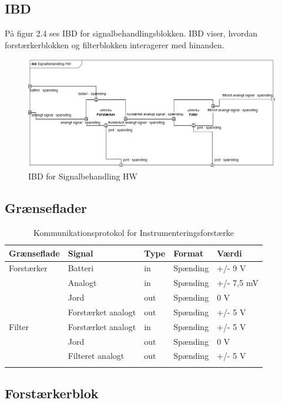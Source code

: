 \subsection{IBD}
På figur 2.4 ses IBD for signalbehandlingsblokken. IBD viser, hvordan forstærkerblokken og filterblokken interagerer med hinanden. 

\begin{figure}[H]
	\centering
	\includegraphics[width=1\textwidth]{Figurer/5}
	\caption{IBD for Signalbehandling HW}
	\label{fig:IBDhw-diagram}
\end{figure}

\subsection{Grænseflader}

\begin{longtabu} to 
	\textbf{Grænseflade} & \textbf{Signal} & \textbf{Type} & \textbf{Format} & \textbf{Værdi} \\[-1ex]
	\midrule
	Forstærker & Batteri & in & Spænding & +/- 9 V \\[-1ex]
			   & Analogt & in & Spænding & +/- 7,5 mV \\[-1ex]
			   & Jord	 & out & Spænding & 0 V \\[-1ex]
			   & Forstærket analogt & out & Spænding & +/- 5 V \\[-1ex]
	Filter	   & Forstærket analogt & in & Spænding & +/- 5 V\\[-1ex]
			   & Jord	 & out & Spænding & 0 V\\[-1ex]
			   & Filteret analogt & out & Spænding & +/- 5 V\\[-1ex]
	\caption{Kommunikationsprotokol for Instrumenteringsforstærke}	
\end{longtabu}


 \subsection{Forstærkerblok}
